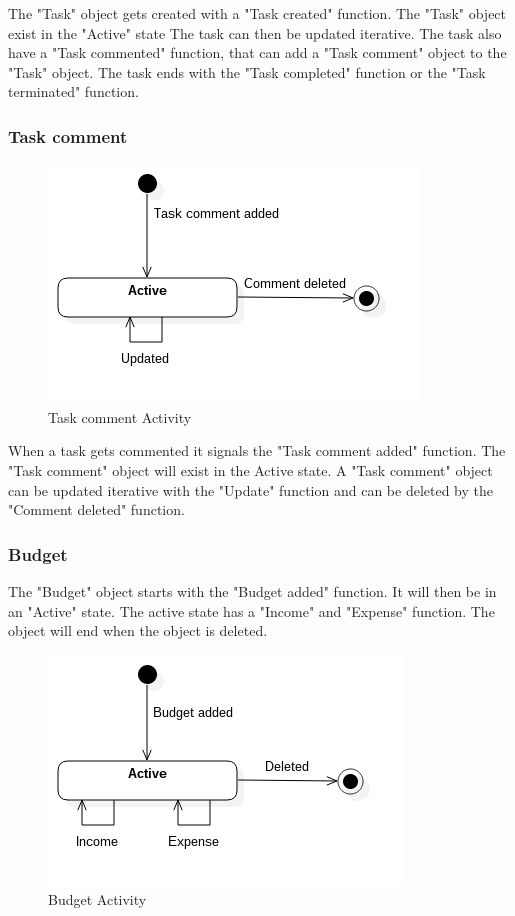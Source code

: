 The "Task" object gets created with a "Task created" function. The "Task" object exist in the "Active" state The task can then be updated iterative. The task also have a "Task commented" function, that can add a "Task comment" object to the "Task" object. The task ends with the "Task completed" function or the "Task terminated" function.

\subsubsection*{Task comment}

\begin{figure}[H]
    \centering
    \includegraphics[scale=0.6]{Images/ProblemDomain/tcActivityDiagram.png}
    \caption{Task comment Activity}
    \label{fig:tcActivityDiagram}
\end{figure}

When a task gets commented it signals the "Task comment added" function. The "Task comment" object will exist in the Active state. A "Task comment" object can be updated iterative with the "Update" function and can be deleted by the "Comment deleted" function.

\subsubsection*{Budget}

The "Budget" object starts with the "Budget added" function. It will then be in an "Active" state. The active state has a "Income" and "Expense" function. The object will end when the object is deleted.

\begin{figure}[H]
    \centering
    \includegraphics[scale=0.6]{Images/ProblemDomain/budgetActivityDiagram.png}
    \caption{Budget Activity}
    \label{fig:budgetActivityDiagram}
\end{figure}

